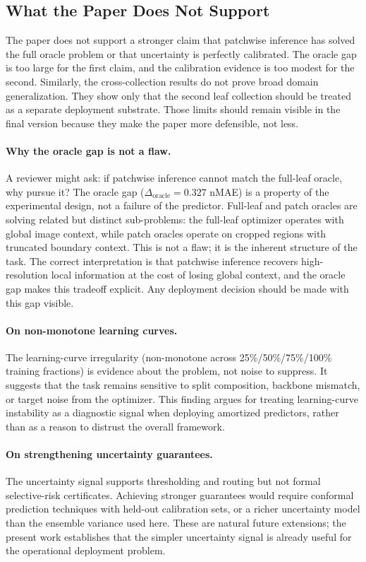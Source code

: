 \documentclass[11pt,a4paper]{article}
\newcommand{\nmae}{nMAE}
\begin{document}
\subsection{What the Paper Does Not Support}
The paper does not support a stronger claim that patchwise inference has solved the full oracle problem or that uncertainty is perfectly calibrated.
The oracle gap is too large for the first claim, and the calibration evidence is too modest for the second.
Similarly, the cross-collection results do not prove broad domain generalization.
They show only that the second leaf collection should be treated as a separate deployment substrate.
Those limits should remain visible in the final version because they make the paper more defensible, not less.

\paragraph{Why the oracle gap is not a flaw.}
A reviewer might ask: if patchwise inference cannot match the full-leaf oracle, why pursue it? The oracle gap ($\Delta_{\mathrm{oracle}} = 0.327$ \nmae{}) is a property of the experimental design, not a failure of the predictor. Full-leaf and patch oracles are solving related but distinct sub-problems: the full-leaf optimizer operates with global image context, while patch oracles operate on cropped regions with truncated boundary context. This is not a flaw; it is the inherent structure of the task. The correct interpretation is that patchwise inference recovers high-resolution local information at the cost of losing global context, and the oracle gap makes this tradeoff explicit. Any deployment decision should be made with this gap visible.

\paragraph{On non-monotone learning curves.}
The learning-curve irregularity (non-monotone across 25\%/50\%/75\%/100\% training fractions) is evidence about the problem, not noise to suppress. It suggests that the task remains sensitive to split composition, backbone mismatch, or target noise from the optimizer. This finding argues for treating learning-curve instability as a diagnostic signal when deploying amortized predictors, rather than as a reason to distrust the overall framework.

\paragraph{On strengthening uncertainty guarantees.}
The uncertainty signal supports thresholding and routing but not formal selective-risk certificates. Achieving stronger guarantees would require conformal prediction techniques with held-out calibration sets, or a richer uncertainty model than the ensemble variance used here. These are natural future extensions; the present work establishes that the simpler uncertainty signal is already useful for the operational deployment problem.
\end{document}
